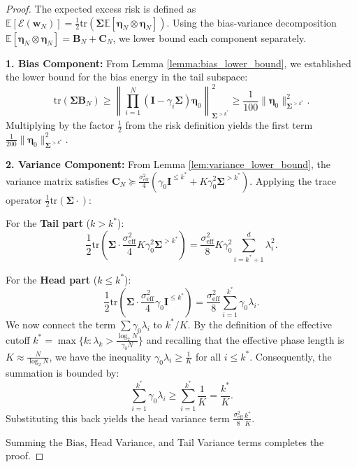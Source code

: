 \documentclass{article}
\theoremstyle{definition}
\theoremstyle{definition}
\theoremstyle{plain}
\theoremstyle{plain}
\theoremstyle{plain}
\theoremstyle{plain}
\theoremstyle{plain}
\newcommand{\bs}[1]{\boldsymbol{\mathbf{#1}}}
\newcommand{\Ex}{\mathbb{E}}
\newcommand{\tr}{\mathrm{tr}}
\newcommand{\eff}{\mathrm{eff}}
\newcommand{\Sig}{\mathbf{\Sigma}}
\newcommand{\id}{\mathbf{I}}
\newcommand{\nm}[2][]{\left\| #2 \right\|^2_{#1}}
\begin{document}
\begin{proof}
    The expected excess risk is defined as $\Ex[\mathcal{E}(\bs w_N)] = \frac{1}{2} \tr(\bs \Sigma \Ex[\bs \eta_N \otimes \bs \eta_N])$. Using the bias-variance decomposition $\Ex[\bs \eta_N \otimes \bs \eta_N] = \bs B_N + \bs C_N$, we lower bound each component separately.

    \textbf{1. Bias Component:}
    From Lemma \ref{lemma:bias_lower_bound}, we established the lower bound for the bias energy in the tail subspace:
    \begin{equation}
        \tr(\bs \Sigma \bs B_N) \ge \nm[\Sig^{> k^*}]{\prod_{i=1}^N(\id-\gamma_i\bs\Sigma)\bs\eta_0} \geq \frac{1}{100} \|\bs\eta_0\|^2_{\Sig^{> k^*}}.
    \end{equation}
    Multiplying by the factor $\frac{1}{2}$ from the risk definition yields the first term $\frac{1}{200}\|\bs\eta_0\|^2_{\Sig^{>k^*}}$.

    \textbf{2. Variance Component:}
    From Lemma \ref{lem:variance_lower_bound}, the variance matrix satisfies $\bs C_N \succeq \frac{\sigma_\eff^2}{4} ( \gamma_0 \id^{\le k^*} + K \gamma_0^2 \bs\Sigma^{>k^*} )$. Applying the trace operator $\frac{1}{2}\tr(\bs\Sigma \cdot)$:
    
    For the \textbf{Tail part} ($k > k^*$):
    \begin{equation}
        \frac{1}{2} \tr\left( \bs \Sigma \cdot \frac{\sigma_\eff^2}{4} K \gamma_0^2 \bs\Sigma^{>k^*} \right) = \frac{\sigma_\eff^2}{8} K \gamma_0^2 \sum_{i=k^*+1}^d \lambda_i^2.
    \end{equation}
    
    For the \textbf{Head part} ($k \le k^*$):
    \begin{equation}
        \frac{1}{2} \tr\left( \bs \Sigma \cdot \frac{\sigma_\eff^2}{4} \gamma_0 \id^{\le k^*} \right) = \frac{\sigma_\eff^2}{8} \sum_{i=1}^{k^*} \gamma_0 \lambda_i.
    \end{equation}
    We now connect the term $\sum \gamma_0 \lambda_i$ to $k^*/K$. By the definition of the effective cutoff $k^* = \max\{k:\lambda_{k}> \frac{\log_2 N}{\gamma_0 N} \}$ and recalling that the effective phase length is $K \approx \frac{N}{\log_2 N}$, we have the inequality $\gamma_0 \lambda_i \ge \frac{1}{K}$ for all $i \le k^*$.
    Consequently, the summation is bounded by:
    \begin{equation}
        \sum_{i=1}^{k^*} \gamma_0 \lambda_i \geq \sum_{i=1}^{k^*} \frac{1}{K} = \frac{k^*}{K}.
    \end{equation}
    Substituting this back yields the head variance term $\frac{\sigma_\eff^2}{8} \frac{k^*}{K}$.

    Summing the Bias, Head Variance, and Tail Variance terms completes the proof.
\end{proof}
\end{document}
